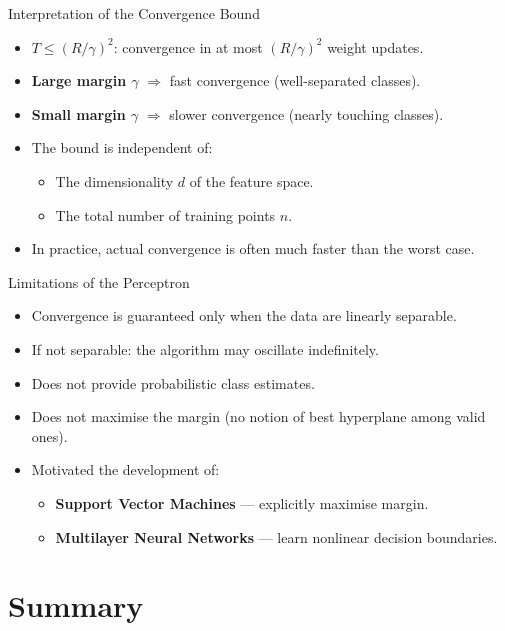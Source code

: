 \begin{frame}{Interpretation of the Convergence Bound}
  \begin{itemize}
    \item $T \le (R/\gamma)^2$: convergence in at most $(R/\gamma)^2$ weight updates.
    \item \textbf{Large margin $\gamma$} $\Rightarrow$ fast convergence (well-separated classes).
    \item \textbf{Small margin $\gamma$} $\Rightarrow$ slower convergence (nearly touching classes).
    \item The bound is \alert{independent} of:
      \begin{itemize}
        \item The dimensionality $d$ of the feature space.
        \item The total number of training points $n$.
      \end{itemize}
    \item In practice, actual convergence is often \alert{much faster} than the worst case.
  \end{itemize}
\end{frame}

\begin{frame}{Limitations of the Perceptron}
  \begin{itemize}
    \item Convergence is guaranteed \alert{only} when the data are linearly separable.
    \item If not separable: the algorithm may \alert{oscillate indefinitely}.
    \item Does not provide probabilistic class estimates.
    \item Does not maximise the margin (no notion of best hyperplane among valid ones).
    \item Motivated the development of:
      \begin{itemize}
        \item \textbf{Support Vector Machines} — explicitly maximise margin.
        \item \textbf{Multilayer Neural Networks} — learn nonlinear decision boundaries.
      \end{itemize}
  \end{itemize}
\end{frame}

\section{Summary}

